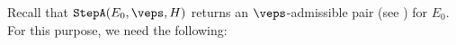 
	
	Recall that $\stepA(E_0,\veps,H)$ returns an
	$\veps$-admissible pair (see ) for $E_0$.
	For this purpose, we need the following:

